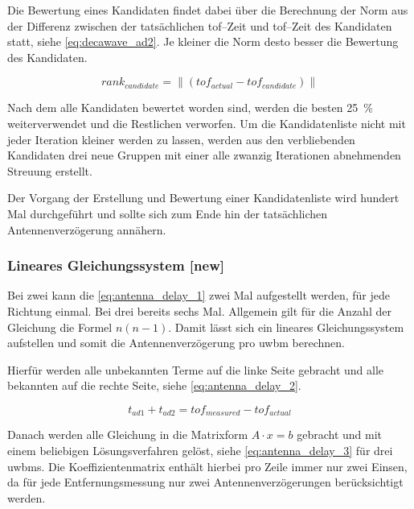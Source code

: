 Die Bewertung eines Kandidaten findet dabei über die Berechnung der Norm aus der Differenz zwischen der tatsächlichen \Gls{tof}--Zeit und \Gls{tof}--Zeit des Kandidaten statt, siehe \autoref{eq:decawave_ad2}. Je kleiner die Norm desto besser die Bewertung des Kandidaten.

\begin{equation}
rank_{candidate}=\lVert (tof_{actual} - tof_{candidate}) \lVert\label{eq:decawave_ad2}
\end{equation}

Nach dem alle Kandidaten bewertet worden sind, werden die besten \SI{25}{\percent} weiterverwendet und die Restlichen verworfen. Um die Kandidatenliste nicht mit jeder Iteration kleiner werden zu lassen, werden aus den verbliebenden Kandidaten drei neue Gruppen mit einer alle zwanzig Iterationen abnehmenden Streuung erstellt.

Der Vorgang der Erstellung und Bewertung einer Kandidatenliste wird hundert Mal durchgeführt und sollte sich zum Ende hin der tatsächlichen Antennenverzögerung annähern.


\begin{comment}
--------------------------------------------------------------------------------
\end{comment}
\subsubsection{Lineares Gleichungssystem [new]}

Bei zwei  kann die \autoref{eq:antenna_delay_1} zwei Mal aufgestellt werden, für jede Richtung einmal. Bei drei  bereits sechs Mal. Allgemein gilt für die Anzahl der Gleichung die Formel $n(n-1)$. Damit lässt sich ein lineares Gleichungssystem aufstellen und somit die Antennenverzögerung pro \Gls{uwbm} berechnen.

Hierfür werden alle unbekannten Terme auf die linke Seite gebracht und alle bekannten auf die rechte Seite, siehe \autoref{eq:antenna_delay_2}.

\begin{equation}
t_{ad1} + t_{ad2} = tof_{measured} - tof_{actual} \label{eq:antenna_delay_2}
\end{equation}

Danach werden alle Gleichung in die Matrixform $A\cdot x=b$ gebracht und mit einem beliebigen Lösungsverfahren gelöst, siehe \autoref{eq:antenna_delay_3} für drei \Glspl{uwbm}. Die Koeffizientenmatrix enthält hierbei pro Zeile immer nur zwei Einsen, da für jede Entfernungsmessung nur zwei Antennenverzögerungen berücksichtigt werden.

